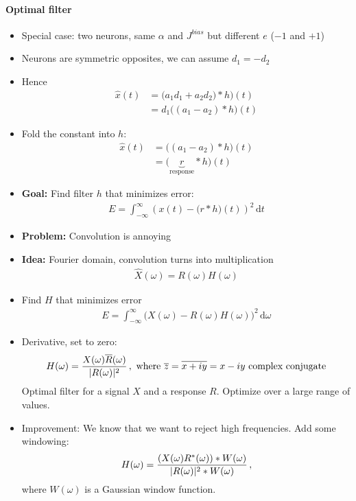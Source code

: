 \documentclass[10pt,letterpaper,oneside]{article}
\begin{document}
\paragraph{Optimal filter}

\begin{itemize}
	\item Special case: two neurons, same $\alpha$ and $J^{bias}$ but different $e$ ($-1$ and $+1$)
	\item Neurons are symmetric opposites, we can assume $d_1 = -d_2$
	\item Hence 
	\begin{align*}
		\hat x(t)
			&= \big(a_1 d_1 + a_2 d_2) \ast h \big)(t)\\
			&=  d_1 \big((a_1 - a_2) \ast h \big)(t)
	\end{align*}
	\item Fold the constant into $h$:
	\begin{align*}
		\hat x(t) &= \big((a_1 - a_2) \ast h \big)(t) \\
				  &= \big(\underbrace{r}_{\text{response}} \ast h \big)(t)
	\end{align*}
	\item \textbf{Goal:} Find filter $h$ that minimizes error:
	\begin{align*}
		E = \int_{-\infty}^\infty \left( x(t) - \big(r \ast h\big)(t) \right)^2 \,\mathrm{d}t
	\end{align*}
	\item \textbf{Problem:} Convolution is annoying
	\item \textbf{Idea:} Fourier domain, convolution turns into multiplication
	\begin{align*}
		\hat{X}(\omega) = R(\omega)H(\omega)
	\end{align*}
	\item Find $H$ that minimizes error
	\begin{align*}
		E = \int_{-\infty}^{\infty} \big( X(\omega) - R(\omega) H(\omega) \big)^2 \,\mathrm{d}\omega
	\end{align*}
	\item Derivative, set to zero:
	\begin{align*}
		H(\omega) = {{X(\omega) \overline{R}(\omega)} \over {|R(\omega)|^2}} \,, \text{ where } \overline{z} = \overline{x + iy} = x - iy \text{ complex conjugate}
	\end{align*}
	Optimal filter for a signal $X$ and a response $R$. Optimize over a large range of values.
	\item Improvement: We know that we want to reject high frequencies. Add some windowing:
	\begin{align*}
		H(\omega)= {{(X(\omega)R^*(\omega)) \ast W(\omega)} \over {|R(\omega)|^2 \ast W(\omega)}} \,,
	\end{align*}
	where $W(\omega)$ is a Gaussian window function.
\end{itemize}
\end{document}

